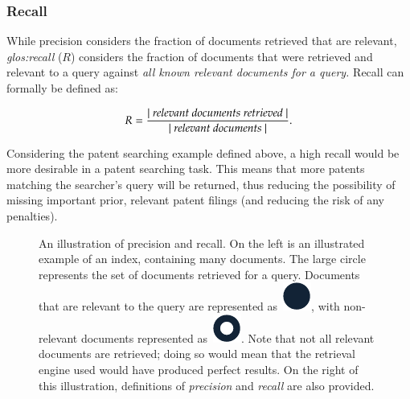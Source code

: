 \subsubsection{Recall}\label{sec:ir_background:evaluation:system:recall}
While precision considers the fraction of documents retrieved that are relevant, \emph{\gls{glos:recall}} ($R$) considers the fraction of documents that were retrieved and relevant to a query against \emph{all known relevant documents for a query.} Recall can formally be defined as:

\begin{equation}
R = \frac{|~\text{\emph{relevant documents retrieved}}~|}{|~\text{\emph{relevant documents}}~|}.
\end{equation}

Considering the patent searching example defined above, a high recall would be more desirable in a patent searching task. This means that more patents matching the searcher's query will be returned, thus reducing the possibility of missing important prior, relevant patent filings (and reducing the risk of any penalties).

\begin{figure}[t!]
    \centering
    \caption[Example illustration of precision and recall]{An illustration of precision and recall. On the left is an illustrated example of an index, containing many documents. The large circle represents the set of documents retrieved for a query. Documents that are relevant to the query are represented as~\includegraphics[height=\fontcharht\font`\d]{figures/ch2-pr-r.pdf}, with non-relevant documents represented as~\includegraphics[height=\fontcharht\font`\d]{figures/ch2-pr-nr.pdf}. Note that not all relevant documents are retrieved; doing so would mean that the retrieval engine used would have produced perfect results. On the right of this illustration, definitions of \emph{precision} and \emph{recall} are also provided.}
    \label{fig:pr}
\end{figure}


